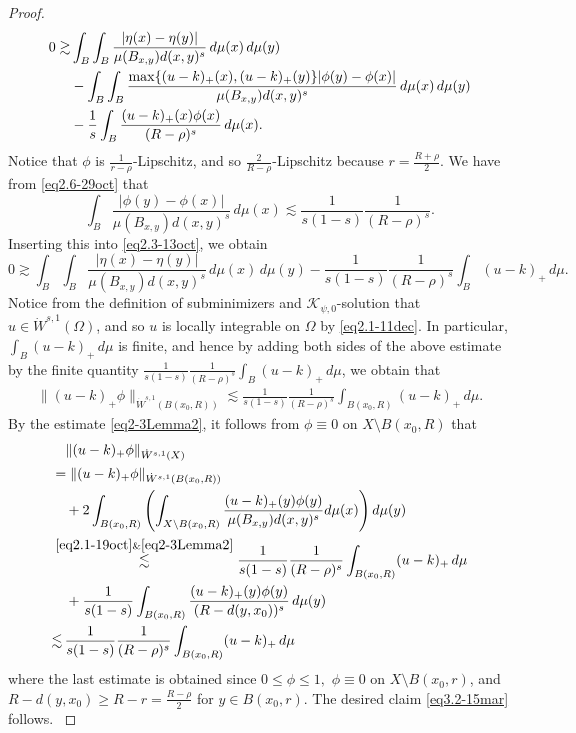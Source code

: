 \documentclass[10pt,a4paper]{amsart}
\begin{document}
\begin{proof}
{\begin{align}
				0\gtrsim&  \int_B\int_B \frac{|\eta(x)-\eta(y)| }{\mu(B_{x,y}) d(x,y)^s}  \,d\mu(x)\,d\mu(y) \notag \\ \notag
				&-   \int_B\int_B \frac{\max\{(u-k)_+(x), (u-k)_+(y) \} |\phi(y)-\phi(x)|}{\mu(B_{x,y}) d(x,y)^s}  \,d\mu(x)\,d\mu(y)
				\\ & - \frac{1}{s} \int_{B} \frac{ (u-k)_+(x)\phi(x) }{(R-\rho)^s}\,d\mu(x).\label{eq2.3-13oct}
			\end{align}
		}
		Notice that $\phi$ is $\frac{1}{r-\rho}$-Lipschitz, and so $\frac{2}{R-\rho}$-Lipschitz because $r=\frac{R+\rho}{2}$. We have from \eqref{eq2.6-29oct} that
		\[
		\int_{B}  \frac{  |\phi(y)-\phi(x)|}{\mu(B_{x,y}) d(x,y)^s}  \,d\mu(x)
		\lesssim \frac{1}{s(1-s)}\frac{1}{(R-\rho)^s}.
		\]
		Inserting this into \eqref{eq2.3-13oct}, we obtain 
		{
			\[
			0\gtrsim   \int_B\int_B \frac{|\eta(x)-\eta(y)| }{\mu(B_{x,y}) d(x,y)^s}  \,d\mu(x)\,d\mu(y) - \frac{1}{s(1-s)}\frac{1}{(R-\rho)^s}\int_{B} (u-k)_+\, d\mu.
			\]
			Notice from the definition of subminimizers and $\mathcal K_{\psi,0}$-solution that $u\in \dot W^{s,1}(\Omega)$, and so $u$ is locally integrable on $\Omega$ by \eqref{eq2.1-11dec}. In particular, $\int_{B} (u-k)_+\, d\mu$ is finite, and hence by adding both sides of the above estimate  by the finite quantity $ \frac{1}{s(1-s)}
			\frac{1}{(R-\rho)^s}
			\int_{B} (u-k)_+\, d\mu$, 
			we obtain that
			\begin{align}
				\|(u-k)_+\phi\|_{\dot W^{s,1}(B(x_0,R))}
				\lesssim
				\frac{1}{s(1-s)}
				\frac{1}{(R-\rho)^s}
				\int_{B(x_0,R)} (u-k)_+\, d\mu.
				\label{eq2.1-19oct}
			\end{align}
			By the estimate  \eqref{eq2-3Lemma2}, it follows from $\phi\equiv 0$ on $X\setminus B(x_0,R)$ that
			\begin{align*}
				&\quad \|(u-k)_+\phi\|_{\dot W^{s,1}(X)}\\
				&= \|(u-k)_+\phi\|_{\dot W^{s,1}(B(x_0,R))} \\
				&\quad + 2 \int_{B(x_0,R)} \left( \int_{X\setminus B(x_0,R)} \frac{(u-k)_+(y)\phi(y)}{\mu(B_{x,y})d(x,y)^s}d\mu(x) \right)d\mu(y)\\
				&\overset{\eqref{eq2.1-19oct} \&  \eqref{eq2-3Lemma2}}{\lesssim} \frac{1}{s(1-s)}\frac{1}{(R-\rho)^s}\int_{B(x_0,R)} (u-k)_+\, d\mu\\
				&\quad + \frac{1}{s(1-s)}\int_{B(x_0,R)}  \frac{(u-k)_+(y)\phi(y)}{{( R- d(y,x_0))^s}}\, d\mu(y)\\
				& {\lesssim} \, \frac{1}{s(1-s)}\frac{1}{(R-\rho)^s}\int_{B(x_0,R)} (u-k)_+\, d\mu
			\end{align*}
			where the last estimate is obtained since $0\leq \phi\leq 1,$  $\phi\equiv  0$ on $ X\setminus B(x_0,r)$, and  $R-d(y,x_0)\geq R-r=\frac{R-\rho}{2}$ for $y\in B(x_0,r)$. The desired claim \eqref{eq3.2-15mar}  follows.
		}
	\end{proof}
\end{document}
